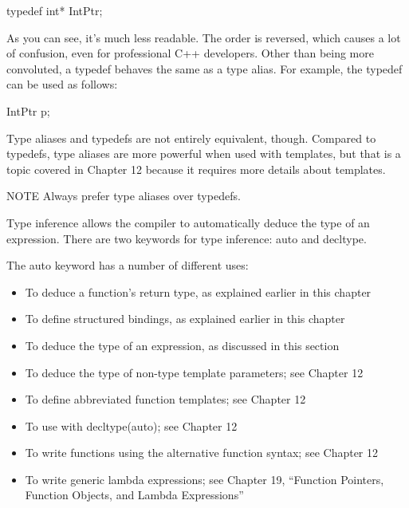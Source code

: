 \begin{cpp}
typedef int* IntPtr;
\end{cpp}

As you can see, it’s much less readable. The order is reversed, which causes a lot of confusion, even for professional C++ developers. Other than being more convoluted, a typedef behaves the same as a type alias. For example, the typedef can be used as follows:

\begin{cpp}
IntPtr p;
\end{cpp}

Type aliases and typedefs are not entirely equivalent, though. Compared to typedefs, type aliases are more powerful when used with templates, but that is a topic covered in Chapter 12 because it requires more details about templates.

\begin{myNotic}{NOTE}
Always prefer type aliases over typedefs.
\end{myNotic}


Type inference allows the compiler to automatically deduce the type of an expression. There are two keywords for type inference: auto and decltype.


The auto keyword has a number of different uses:

\begin{itemize}
\item
To deduce a function’s return type, as explained earlier in this chapter

\item
To define structured bindings, as explained earlier in this chapter

\item
To deduce the type of an expression, as discussed in this section

\item
To deduce the type of non-type template parameters; see Chapter 12

\item
To define abbreviated function templates; see Chapter 12

\item
To use with decltype(auto); see Chapter 12

\item
To write functions using the alternative function syntax; see Chapter 12

\item
To write generic lambda expressions; see Chapter 19, “Function Pointers, Function Objects, and Lambda Expressions”
\end{itemize}

